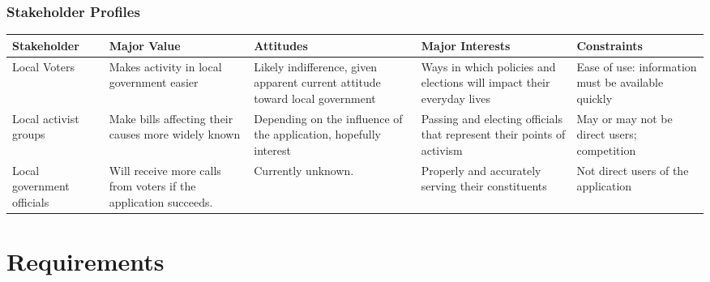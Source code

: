 \documentclass[12pt,oneside,letterpaper]{article}
\newcounter{use_case}
\newcounter{functional_requirement}
\begin{document}
\subsubsection{Stakeholder Profiles}
\begin{adjustbox}{center,minipage=[c]{\paperwidth - 1in}}
  \begin{tabu}{lX[L]X[L]X[L]X[L]}
    \toprule
    Stakeholder & Major Value & Attitudes & Major Interests & Constraints\\
    \midrule
    Local Voters&
    Makes activity in local government easier&
    Likely indifference, given apparent current attitude toward local government&
    Ways in which policies and elections will impact their everyday lives&
    Ease of use: information must be available quickly\\

    Local activist groups&
    Make bills affecting their causes more widely known&
    Depending on the influence of the application, hopefully interest&
    Passing and electing officials that represent their points of activism&
    May or may not be direct users; competition\\

    Local government officials&
    Will receive more calls from voters if the application succeeds.&
    Currently unknown.&
    Properly and accurately serving their constituents&
    Not direct users of the application\\
    \bottomrule
  \end{tabu}
\end{adjustbox}

\section{Requirements}

\end{document}
